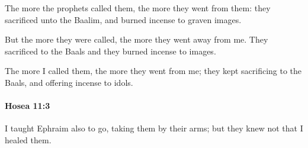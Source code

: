 			\begin{versebox}
					\item[BHS] 
					\item[LXX] 
					\item[ASV] The more the prophets called them, the more they went from them: they sacrificed unto the Baalim, and burned incense to graven images.
					\item[NIV] But the more they were called, the more they went away from me. They sacrificed to the Baals and they burned incense to images.
					\item[NRSV] The more I called them, the more they went from me; they kept sacrificing to the Baals, and offering incense to idols.
			\end{versebox}

		\paragraph{Hosea 11:3} %
			\label{HOSEA-11-3}

			I taught Ephraim also to go, taking them by their arms; but they knew not that I healed them.

